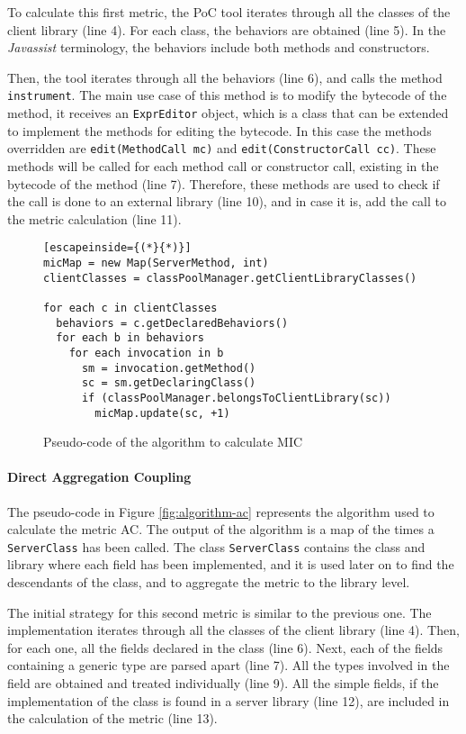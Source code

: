 To calculate this first metric, the PoC tool iterates through all the classes of the client library (line 4). For each class, the behaviors are obtained (line 5). In the \textit{Javassist} terminology, the behaviors include both methods and constructors.

Then, the tool iterates through all the behaviors (line 6), and calls the method \texttt{instrument}. The main use case of this method is to modify the bytecode of the method, it receives an \texttt{ExprEditor} object, which is a class that can be extended to implement the methods for editing the bytecode. In this case the methods overridden are \texttt{edit(MethodCall mc)} and \texttt{edit(ConstructorCall cc)}. These methods will be called for each method call or constructor call, existing in the bytecode of the method (line 7). Therefore, these methods are used to check if the call is done to an external library (line 10), and in case it is, add the call to the metric calculation (line 11).

\begin{figure}[h!]
\begin{lstlisting}[escapeinside={(*}{*)}]
micMap = new Map(ServerMethod, int)
clientClasses = classPoolManager.getClientLibraryClasses()

for each c in clientClasses
  behaviors = c.getDeclaredBehaviors()
  for each b in behaviors
    for each invocation in b
      sm = invocation.getMethod()
      sc = sm.getDeclaringClass()
      if (classPoolManager.belongsToClientLibrary(sc))
        micMap.update(sc, +1)
\end{lstlisting}
\caption{Pseudo-code of the algorithm to calculate MIC}
\label{fig:algorithm-mic}
\end{figure}

\paragraph{Direct Aggregation Coupling}
The pseudo-code in Figure \ref{fig:algorithm-ac} represents the algorithm used to calculate the metric AC. The output of the algorithm is a map of the times a \texttt{ServerClass} has been called. The class \texttt{ServerClass} contains the class and library where each field has been implemented, and it is used later on to find the descendants of the class, and to aggregate the metric to the library level.

The initial strategy for this second metric is similar to the previous one. The implementation iterates through all the classes of the client library (line 4). Then, for each one, all the fields declared in the class (line 6). Next, each of the fields containing a generic type are parsed apart (line 7). All the types involved in the field are obtained and treated individually (line 9). All the simple fields, if the implementation of the class is found in a server library (line 12), are included in the calculation of the metric (line 13).

